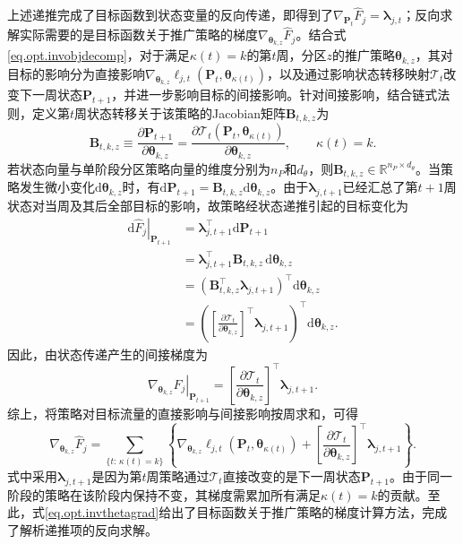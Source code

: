 上述递推完成了目标函数到状态变量的反向传递，即得到了$\nabla_{\bm{P}_{t}}\hat F_j=\bm{\lambda}_{j,t}$；反向求解实际需要的是目标函数关于推广策略的梯度$\nabla_{\bm{\theta}_{k,z}}\hat F_j$。结合式\eqref{eq.opt.invobjdecomp}，对于满足$\kappa(t)=k$的第$t$周，分区$z$的推广策略$\bm{\theta}_{k,z}$，其对目标的影响分为直接影响$\nabla_{\bm{\theta}_{k,z}}\ell_{j,t}\left(\bm{P}_{t},\bm{\theta}_{\kappa(t)}\right)$，以及通过影响状态转移映射$\mathcal{T}_{t}$改变下一周状态$\bm{P}_{t+1}$，并进一步影响目标的间接影响。针对间接影响，结合链式法则，定义第$t$周状态转移关于该策略的Jacobian矩阵$\bm{B}_{t,k,z}$为
\begin{equation}
\bm{B}_{t,k,z}
\equiv
\frac{\partial\bm{P}_{t+1}}
{\partial\bm{\theta}_{k,z}}
=
\frac{\partial\mathcal{T}_{t}
\left(\bm{P}_{t},\bm{\theta}_{\kappa(t)}\right)}
{\partial\bm{\theta}_{k,z}},
\qquad \kappa(t)=k.
\label{eq.opt.invstrategyjac}
\end{equation}
若状态向量与单阶段分区策略向量的维度分别为$n_{P}$和$d_{\theta}$，则$\bm{B}_{t,k,z}\in\mathbb{R}^{n_{P}\times d_{\theta}}$。当策略发生微小变化$\mathrm{d}\bm{\theta}_{k,z}$时，有$\mathrm{d}\bm{P}_{t+1}=\bm{B}_{t,k,z}\mathrm{d}\bm{\theta}_{k,z}$。由于$\bm{\lambda}_{j,t+1}$已经汇总了第$t+1$周状态对当周及其后全部目标的影响，故策略经状态递推引起的目标变化为
\begin{equation}
\begin{aligned}
\left.\mathrm{d}\hat F_j\right|_{\bm{P}_{t+1}}
&=
\bm{\lambda}_{j,t+1}^{\top}
\mathrm{d}\bm{P}_{t+1}
\\
&=
\bm{\lambda}_{j,t+1}^{\top}
\bm{B}_{t,k,z}\,
\mathrm{d}\bm{\theta}_{k,z}
\\
&=
\left(
\bm{B}_{t,k,z}^{\top}
\bm{\lambda}_{j,t+1}
\right)^{\top}
\mathrm{d}\bm{\theta}_{k,z}
\\
&=
\left(
\left[
\frac{\partial \mathcal{T}_{t}}
{\partial \bm{\theta}_{k,z}}
\right]^{\top}
\bm{\lambda}_{j,t+1}
\right)^{\top}
\mathrm{d}\bm{\theta}_{k,z}.
\end{aligned}
\label{eq.opt.invchainbridge}
\end{equation}
因此，由状态传递产生的间接梯度为
\begin{equation}
\left.
\nabla_{\bm{\theta}_{k,z}}\hat F_j
\right|_{\bm{P}_{t+1}}
=
\left[
\frac{\partial \mathcal{T}_{t}}
{\partial \bm{\theta}_{k,z}}
\right]^{\top}
\bm{\lambda}_{j,t+1}.
\end{equation}
综上，将策略对目标流量的直接影响与间接影响按周求和，可得
\begin{equation}
\nabla_{\bm{\theta}_{k,z}}\hat F_j
=
\sum_{\{t:\,\kappa(t)=k\}}
\left\{
\nabla_{\bm{\theta}_{k,z}}
\ell_{j,t}
\left(
\bm{P}_{t},
\bm{\theta}_{\kappa(t)}
\right)
+
\left[
\frac{\partial \mathcal{T}_{t}}
{\partial \bm{\theta}_{k,z}}
\right]^{\top}
\bm{\lambda}_{j,t+1}
\right\}.
\label{eq.opt.invthetagrad}
\end{equation}
式中采用$\bm{\lambda}_{j,t+1}$是因为第$t$周策略通过$\mathcal{T}_{t}$直接改变的是下一周状态$\bm{P}_{t+1}$。由于同一阶段的策略在该阶段内保持不变，其梯度需累加所有满足$\kappa(t)=k$的贡献。至此，式\eqref{eq.opt.invthetagrad}给出了目标函数关于推广策略的梯度计算方法，完成了解析递推项的反向求解。

